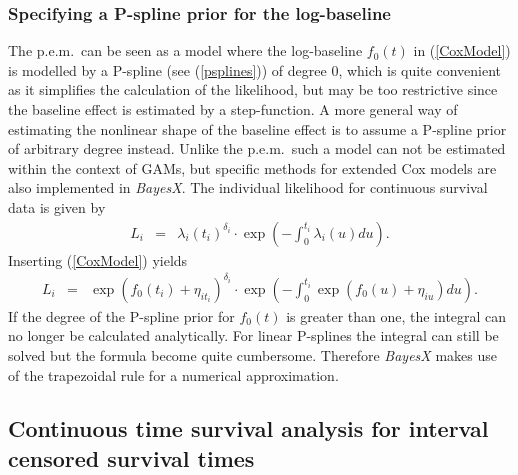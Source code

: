 \documentclass[11pt,a4paper,twoside]{bayesxarticle}
\begin{document}
\subsubsection{Specifying a P-spline prior for the log-baseline}

The p.e.m.~can be seen as a model where the log-baseline $f_0(t)$ in
(\ref{CoxModel}) is modelled by a P-spline (see (\ref{psplines})) of
degree 0, which is quite convenient as it simplifies the calculation
of the likelihood, but may be too restrictive since the baseline
effect is estimated by a step-function. A more general way of
estimating the nonlinear shape of the baseline effect is to assume a
P-spline prior of arbitrary degree instead. Unlike the p.e.m.~such a
model can not be estimated within the context of GAMs, but specific
methods for extended Cox models are also implemented in {\it
BayesX}. The individual likelihood for continuous survival data is
given by
\begin{eqnarray}\nonumber
L_i &=&\lambda_i(t_i)^{\delta_i}\cdot
\exp\left(-\int_{0}^{t_i}\lambda_i(u)du\right).
\end{eqnarray}
Inserting (\ref{CoxModel}) yields
\begin{eqnarray}\nonumber
L_i &=&\exp(f_0(t_i)+\eta_{i t_i})^{\delta_i}\cdot
\exp\left(-\int_{0}^{t_i}\exp(f_0(u)+\eta_{iu})du\right).
\end{eqnarray}
If the degree of the P-spline prior for $f_0(t)$ is greater than
one, the integral can no longer be calculated analytically. For
linear P-splines the integral can still be solved but the formula
become quite cumbersome. Therefore {\it BayesX} makes use of the
trapezoidal rule for a numerical approximation.

\subsection{Continuous time survival analysis for interval censored survival times}
\label{intervalcensoring}
\end{document}
